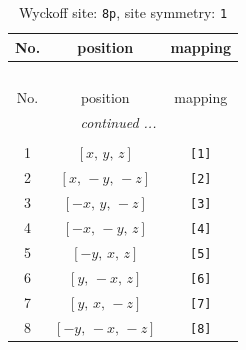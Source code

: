 \documentclass[fleqn,8pt]{jsarticle}
\begin{document}
\renewcommand{\arraystretch}{1.2}
\begin{longtable}{ccc}
\caption{Wyckoff site: {\tt 8p}, site symmetry: {\tt 1}}
 \\
 \hline \hline
No. & position & mapping \\ \hline \endfirsthead

\multicolumn{2}{l}{\tablename\ \thetable{}} \\
 \hline \hline
No. & position & mapping \\ \hline \endhead

 \hline \hline
\multicolumn{2}{r}{\footnotesize\it continued ...} \\ \endfoot

 \hline \hline
\multicolumn{2}{r}{} \\ \endlastfoot

1 & $\left[ x,\, y,\, z \right]$ & {\tt [1]} \\ \hline
2 & $\left[ x,\, - y,\, - z \right]$ & {\tt [2]} \\ \hline
3 & $\left[ - x,\, y,\, - z \right]$ & {\tt [3]} \\ \hline
4 & $\left[ - x,\, - y,\, z \right]$ & {\tt [4]} \\ \hline
5 & $\left[ - y,\, x,\, z \right]$ & {\tt [5]} \\ \hline
6 & $\left[ y,\, - x,\, z \right]$ & {\tt [6]} \\ \hline
7 & $\left[ y,\, x,\, - z \right]$ & {\tt [7]} \\ \hline
8 & $\left[ - y,\, - x,\, - z \right]$ & {\tt [8]} \\
\end{longtable}
\end{document}
